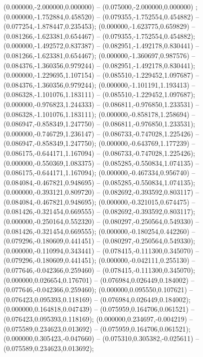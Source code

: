  (0.000000,-2.000000,0.000000) -- (0.075000,-2.000000,0.000000) ;
 (0.000000,-1.752884,0.458520) -- (0.079355,-1.752554,0.454882) -- (0.077254,-1.878447,0.235453);
 (0.000000,-1.623775,0.659829) -- (0.081266,-1.623381,0.654467) -- (0.079355,-1.752554,0.454882);
 (0.000000,-1.492572,0.837387) -- (0.082951,-1.492178,0.830441) -- (0.081266,-1.623381,0.654467);
 (0.000000,-1.360697,0.987576) -- (0.084376,-1.360356,0.979244) -- (0.082951,-1.492178,0.830441);
 (0.000000,-1.229695,1.107154) -- (0.085510,-1.229452,1.097687) -- (0.084376,-1.360356,0.979244);
 (0.000000,-1.101191,1.193413) -- (0.086328,-1.101076,1.183111) -- (0.085510,-1.229452,1.097687);
 (0.000000,-0.976823,1.244333) -- (0.086811,-0.976850,1.233531) -- (0.086328,-1.101076,1.183111);
 (0.000000,-0.858178,1.258694) -- (0.086947,-0.858349,1.247750) -- (0.086811,-0.976850,1.233531);
 (0.000000,-0.746729,1.236147) -- (0.086733,-0.747028,1.225426) -- (0.086947,-0.858349,1.247750);
 (0.000000,-0.643769,1.177239) -- (0.086175,-0.644171,1.167094) -- (0.086733,-0.747028,1.225426);
 (0.000000,-0.550369,1.083375) -- (0.085285,-0.550834,1.074135) -- (0.086175,-0.644171,1.167094);
 (0.000000,-0.467334,0.956740) -- (0.084084,-0.467821,0.948695) -- (0.085285,-0.550834,1.074135);
 (0.000000,-0.393121,0.809720) -- (0.082692,-0.393592,0.803117) -- (0.084084,-0.467821,0.948695);
 (0.000000,-0.321015,0.674475) -- (0.081426,-0.321454,0.669555) -- (0.082692,-0.393592,0.803117);
 (0.000000,-0.250164,0.552320) -- (0.080297,-0.250564,0.549330) -- (0.081426,-0.321454,0.669555);
 (0.000000,-0.180254,0.442260) -- (0.079296,-0.180609,0.441451) -- (0.080297,-0.250564,0.549330);
 (0.000000,-0.110994,0.343441) -- (0.078415,-0.111300,0.345070) -- (0.079296,-0.180609,0.441451);
 (0.000000,-0.042111,0.255130) -- (0.077646,-0.042366,0.259460) -- (0.078415,-0.111300,0.345070);
 (0.000000,0.026654,0.176701) -- (0.076984,0.026449,0.184002) -- (0.077646,-0.042366,0.259460);
 (0.000000,0.095550,0.107621) -- (0.076423,0.095393,0.118169) -- (0.076984,0.026449,0.184002);
 (0.000000,0.164818,0.047439) -- (0.075959,0.164706,0.061521) -- (0.076423,0.095393,0.118169);
 (0.000000,0.234697,-0.004219) -- (0.075589,0.234623,0.013692) -- (0.075959,0.164706,0.061521);
 (0.000000,0.305423,-0.047660) -- (0.075310,0.305382,-0.025611) -- (0.075589,0.234623,0.013692);
